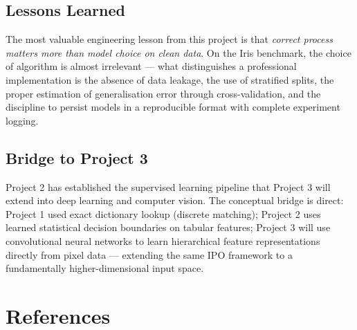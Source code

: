 \documentclass[12pt, a4paper]{report}
\begin{document}
\section{Lessons Learned}

The most valuable engineering lesson from this project is that \textit{correct process
matters more than model choice on clean data}. On the Iris benchmark, the choice of
algorithm is almost irrelevant — what distinguishes a professional implementation is
the absence of data leakage, the use of stratified splits, the proper estimation of
generalisation error through cross-validation, and the discipline to persist models in
a reproducible format with complete experiment logging.

\section{Bridge to Project 3}

Project 2 has established the supervised learning pipeline that Project 3 will extend
into deep learning and computer vision. The conceptual bridge is direct: Project 1 used
exact dictionary lookup (discrete matching); Project 2 uses learned statistical decision
boundaries on tabular features; Project 3 will use convolutional neural networks to learn
hierarchical feature representations directly from pixel data — extending the same
IPO framework to a fundamentally higher-dimensional input space.

\chapter*{References}
\end{document}
